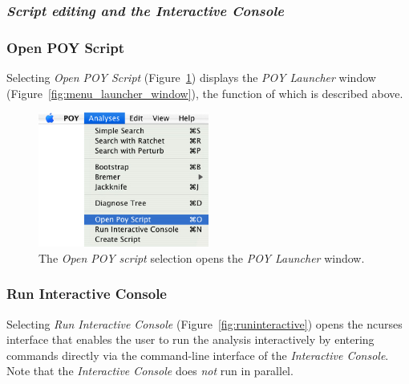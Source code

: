 \subsubsection{\emph{Script editing and the Interactive Console}}

\subsubsection{Open POY Script}

Selecting \emph{Open POY Script} (Figure~\ref{fig:open_poy_script}) displays the \emph{POY Launcher} 
window (Figure~\ref{fig:menu_launcher_window}), the function of which is described above.

\begin{figure}[htpb]
    \begin{center}
        \includegraphics[width=0.5\textwidth]{doc/figures/openpoyscript_menu.jpg}
    \end{center}
    \caption{The \emph{Open POY script} selection opens the \emph{POY Launcher} window.}
    \label{fig:open_poy_script}
\end{figure}

\subsubsection{Run Interactive Console}

Selecting \emph{Run Interactive Console} (Figure~\ref{fig:runinteractive}) opens the ncurses interface
that enables the user to run the analysis interactively by entering
\poy commands directly via the command-line interface of the \emph{Interactive
Console}. Note that the \emph{Interactive Console} does \emph{not} run in parallel.

